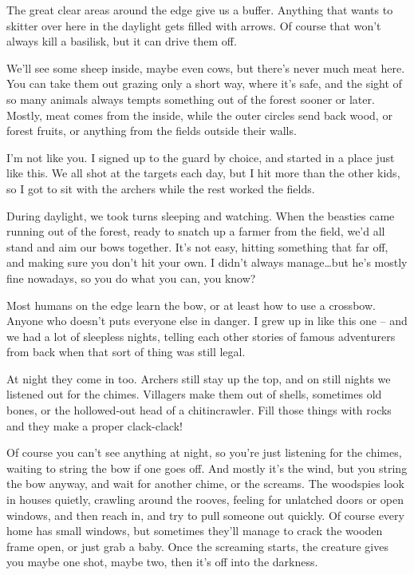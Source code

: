 \begin{multicols}{2}
\begin{exampletext}
  The great clear areas around the \gls{edge} give us a buffer.
  Anything that wants to skitter over here in the daylight gets filled with arrows.
  Of course that won't always kill a basilisk, but it can drive them off.

  We'll see some sheep inside, maybe even cows, but there's never much meat here.
  You can take them out grazing only a short way, where it's safe, and the sight of so many animals always tempts something out of the forest sooner or later.
  Mostly, meat comes from the inside, while the outer circles send back wood, or forest fruits, or anything from the fields outside their walls.

  I'm not like you.
  I signed up to the \gls{guard} by choice, and started in a place just like this.
  We all shot at the targets each day, but I hit more than the other kids, so I got to sit with the archers while the rest worked the fields.

  During daylight, we took turns sleeping and watching.
  When the beasties came running out of the forest, ready to snatch up a farmer from the field, we'd all stand and aim our bows together.
  It's not easy, hitting something that far off, and making sure you don't hit your own.
  I didn't always manage\ldots but he's mostly fine nowadays, so you do what you can, you know?

  Most humans on the \gls{edge} learn the bow, or at least how to use a crossbow.
  Anyone who doesn't puts everyone else in danger.
  I grew up in  like this one -- and we had a lot of sleepless nights, telling each other stories of famous adventurers from back when that sort of thing was still legal.

  At night they come in too.
  Archers still stay up the top, and on still nights we listened out for the chimes.
  Villagers make them out of shells, sometimes old bones, or the hollowed-out head of a chitincrawler.
  Fill those things with rocks and they make a proper clack-clack!

  Of course you can't see anything at night, so you're just listening for the chimes, waiting to string the bow if one goes off.
  And mostly it's the wind, but you string the bow anyway, and wait for another chime, or the screams.
  The woodspies look in houses quietly, crawling around the rooves, feeling for unlatched doors or open windows, and then reach in, and try to pull someone out quickly.
  Of course every home has small windows, but sometimes they'll manage to crack the wooden frame open, or just grab a baby.
  Once the screaming starts, the creature gives you maybe one shot, maybe two, then it's off into the darkness.


\end{exampletext}
\end{multicols}
